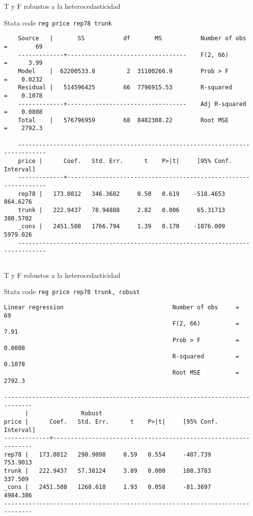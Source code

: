 \begin{frame}[fragile]{T y F robustos a la heterocedasticidad}
	\begin{Stata code}{Stata code}
		\texttt{\textcolor{codeblue}{reg} price rep78 trunk}
	\end{Stata code}
		\vspace{0.5cm}
	\scriptsize{
		\begin{verbatim}
	Source   |       SS           df       MS           Number of obs   =        69
	-------------+----------------------------------    F(2, 66)        =      3.99
	Model    |  62200533.8         2  31100266.9        Prob > F        =    0.0232
	Residual |   514596425        66  7796915.53        R-squared       =    0.1078
	-------------+----------------------------------    Adj R-squared   =    0.0808
	Total    |   576796959        68  8482308.22        Root MSE        =    2792.3
	
	------------------------------------------------------------------------------
	price |      Coef.   Std. Err.      t    P>|t|     [95% Conf. Interval]
	-------------+----------------------------------------------------------------
	rep78 |   173.0812   346.3682     0.50   0.619    -518.4653    864.6276
	trunk |   222.9437   78.94888     2.82   0.006     65.31713    380.5702
	_cons |   2451.508   1766.794     1.39   0.170    -1076.009    5979.026
	------------------------------------------------------------------------------
			
		\end{verbatim}
	}
\end{frame}

\begin{frame}[fragile] {T y F robustos a la heterocedasticidad}
	\begin{Stata code}{Stata code}
		\texttt{\textcolor{codeblue}{reg} price rep78 trunk, robust}
	\end{Stata code}
		\vspace{0.5cm}	
	\scriptsize{
		\begin{verbatim}
Linear regression                               Number of obs     =         69
                                                F(2, 66)          =       7.91
                                                Prob > F          =     0.0008
                                                R-squared         =     0.1078
                                                Root MSE          =     2792.3

------------------------------------------------------------------------------
      |               Robust
price |      Coef.   Std. Err.      t    P>|t|     [95% Conf. Interval]
-------------+----------------------------------------------------------------
rep78 |   173.0812   290.9098     0.59   0.554     -407.739    753.9013
trunk |   222.9437   57.38124     3.89   0.000     108.3783     337.509
_cons |   2451.508   1268.618     1.93   0.058     -81.3697    4984.386
------------------------------------------------------------------------------
			
		\end{verbatim}
	}
\end{frame}